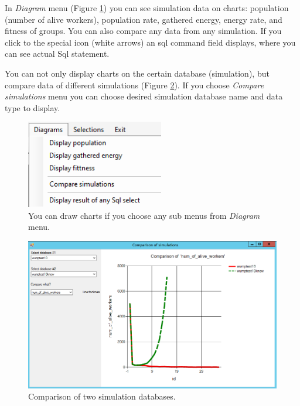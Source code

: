 \documentclass[a4paper,12pt]{article}
\begin{document}
In \textit{Diagram} menu (Figure \ref{fig:mnudiagrams}) you can see simulation data on charts: population (number of alive workers), population rate, gathered energy, energy rate, and fitness of groups. You can also compare any data from any simulation. If you click to the special icon (white arrows) an sql command field displays, where you can see actual Sql statement.

You can not only display charts on the certain database (simulation), but compare data of different simulations (Figure \ref{fig:comparison}). If you choose \textit{Compare simulations} menu you can choose desired simulation database name and data type to display.

\begin{figure}
	\begin{center}
		\includegraphics[width=6cm]{mnudiagrams.png}
		\caption{You can draw charts if you choose any sub menus from \textit{Diagram} menu. }
		\label{fig:mnudiagrams}
	\end{center}
\end{figure}

\begin{figure}
	\begin{center}
		\includegraphics[width=15cm]{comparison.png}
		\caption{Comparison of two simulation databases.}
		\label{fig:comparison}
	\end{center}
\end{figure}
		
\end{document}
